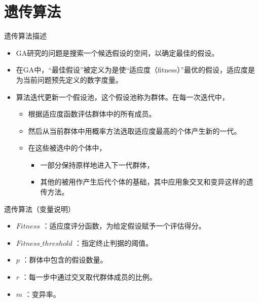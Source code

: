 \documentclass[presentation]{beamer}
\begin{document}
\section{遗传算法}
\label{sec:org3954caa}
\begin{frame}[label={sec:org7291fae}]{遗传算法描述}
\begin{itemize}
\item GA研究的问题是搜索一个候选假设的空间，以确定最佳的假设。
\item 在GA中，“最佳假设”被定义为是使“适应度（fitness）”最优的假设，适应度是为当前问题预先定义的数字度量。
\item 算法迭代更新一个假设池，这个假设池称为群体。在每一次迭代中，
\begin{itemize}
\item 根据适应度函数评估群体中的所有成员。
\item 然后从当前群体中用概率方法选取适应度最高的个体产生新的一代。
\item 在这些被选中的个体中，
\begin{itemize}
\item 一部分保持原样地进入下一代群体，
\item 其他的被用作产生后代个体的基础，其中应用象交叉和变异这样的遗传方法。
\end{itemize}
\end{itemize}
\end{itemize}
\end{frame}
\begin{frame}[label={sec:orgf4c1da8}]{遗传算法（变量说明）}
\begin{itemize}
\item \(Fitness\) ：适应度评分函数，为给定假设赋予一个评估得分。
\item \(Fitness\_threshold\) ：指定终止判据的阈值。
\item \(p\) ：群体中包含的假设数量。
\item \(r\) ：每一步中通过交叉取代群体成员的比例。
\item \(m\) ：变异率。
\end{itemize}
\end{frame}
\end{document}
